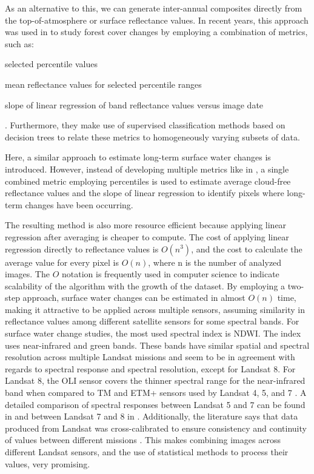 As an alternative to this, we can generate inter-annual composites directly from the top-of-atmosphere or surface reflectance values. In recent years, this approach was used in \citet{Hansen2013} to study forest cover changes by employing a combination of metrics, such as: 
\begin{enumerate*}[label=(\emph{\alph*})]
	\item selected percentile values
	\item mean reflectance values for selected percentile ranges
	\item slope of linear regression of band reflectance values versus image date
\end{enumerate*}. Furthermore, they make use of supervised classification methods based on decision trees to relate these metrics to homogeneously varying subsets of data.

Here, a similar approach to estimate long-term surface water changes is introduced. However, instead of developing multiple metrics like in \citet{Hansen2013}, a single combined metric employing percentiles is used to estimate average cloud-free reflectance values and the slope of linear regression to identify pixels where long-term changes have been occurring. 

The resulting method is also more resource efficient because applying linear regression after averaging is cheaper to compute. The cost of applying linear regression directly to reflectance values is $O(n^3)$, and the cost to calculate the average value for every pixel is $O(n)$, where n is the number of analyzed images. The $O$ notation is frequently used in computer science to indicate scalability of the algorithm with the growth of the dataset. By employing a two-step approach, surface water changes can be estimated in almost $O(n)$ time, making it attractive to be applied across multiple sensors, assuming similarity in reflectance values among different satellite sensors for some spectral bands. For surface water change studies, the most used spectral index is \gls{NDWI}. The index uses near-infrared and green bands. These bands have similar spatial and spectral resolution across multiple Landsat missions and seem to be in agreement with regards to spectral response and spectral resolution, except for Landsat 8. For Landsat 8, the OLI sensor covers the thinner spectral range for the near-infrared band when compared to TM and ETM+ sensors used by Landsat 4, 5, and 7 \citet{roy2016characterization, angal2014cross}. A detailed comparison of spectral responses between Landsat 5 and 7 can be found in \citet{teillet2001radiometric} and between Landsat 7 and 8 in \citet{flood2014continuity}. Additionally, the literature says that data produced from Landsat was cross-calibrated to ensure consistency and continuity of values between different missions \citet{mishra2014radiometric}. This makes combining images across different Landsat sensors, and the use of statistical methods to process their values, very promising.


